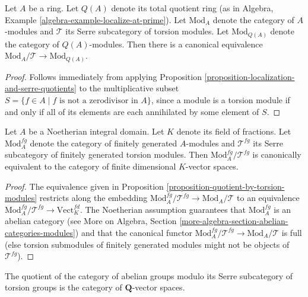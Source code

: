 \begin{proposition}
\label{proposition-quotient-by-torsion-modules}
Let $A$ be a ring. Let $Q(A)$ denote its total quotient ring
(as in Algebra, Example \ref{algebra-example-localize-at-prime}). Let
$\text{Mod}_A$ denote the category of $A$-modules and $\mathcal{T}$ its
Serre subcategory of torsion modules. Let $\text{Mod}_{Q(A)}$
denote the category
of $Q(A)$-modules. Then there is a canonical equivalence
$\text{Mod}_A/\mathcal{T} \rightarrow \text{Mod}_{Q(A)}$.
\end{proposition}

\begin{proof}
Follows immediately from applying Proposition
\ref{proposition-localization-and-serre-quotients} to the multiplicative subset
$S = \{f \in A \mid f \text{ is not a zerodivisor in }A\}$, since a module is a
torsion module if and only if all of its elements are each annihilated by some
element of $S$.
\end{proof}

\begin{proposition}
\label{proposition-quotient-by-finitely-generated-torsion-modules}
Let $A$ be a Noetherian integral domain. Let $K$ denote its field of fractions.
Let $\text{Mod}_A^{fg}$ denote the category of finitely generated $A$-modules
and $\mathcal{T}^{fg}$ its Serre subcategory of finitely generated torsion
modules. Then $\text{Mod}_A^{fg}/\mathcal{T}^{fg}$ is canonically equivalent
to the category of finite dimensional $K$-vector spaces.
\end{proposition}

\begin{proof}
The equivalence given in Proposition
\ref{proposition-quotient-by-torsion-modules} restricts along the embedding
$\text{Mod}_A^{fg}/\mathcal{T}^{fg} \to \text{Mod}_A/\mathcal{T}$ to an
equivalence $\text{Mod}_A^{fg}/\mathcal{T}^{fg} \to \text{Vect}_K^{fd}$.
The Noetherian assumption guarantees that $\text{Mod}_A^{fg}$ is an
abelian category (see
More on Algebra, Section \ref{more-algebra-section-abelian-categories-modules})
and that the canonical functor
$\text{Mod}_A^{fg}/\mathcal{T}^{fg} \to \text{Mod}_A/\mathcal{T}$
is full (else torsion submodules of finitely
generated modules might not be objects of $\mathcal{T}^{fg}$).
\end{proof}

\begin{proposition}
\label{proposition-quotient-abelian-groups-by-torsion-groups}
The quotient of the category of abelian groups modulo its
Serre subcategory of torsion groups is the category of
$\mathbf{Q}$-vector spaces.
\end{proposition}

